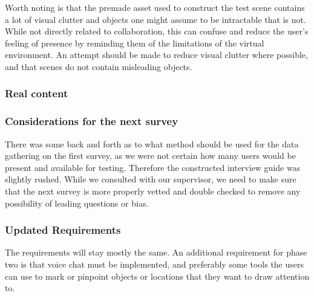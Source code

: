 Worth noting is that the premade asset used to construct the test scene contains a lot of visual clutter and objects one might assume to be intractable that is not. While not directly related to collaboration, this can confuse and reduce the user's feeling of presence by reminding them of the limitations of the virtual environment. An attempt should be made to reduce visual clutter where possible, and that scenes do not contain misleading objects.

\subsubsection{Real content}


\subsubsection{Considerations for the next survey}
There was some back and forth as to what method should be used for the data gathering on the first survey, as we were not certain how many users would be present and available for testing. Therefore the constructed interview guide was slightly rushed. While we consulted with our supervisor, we need to make sure that the next survey is more properly vetted and double checked to remove any possibility of leading questions or bias. 

\subsubsection{Updated Requirements}
The requirements will stay mostly the same. An additional requirement for phase two is that voice chat must be implemented, and preferably some tools the users can use to mark or pinpoint objects or locations that they want to draw attention to.



\cleardoublepage